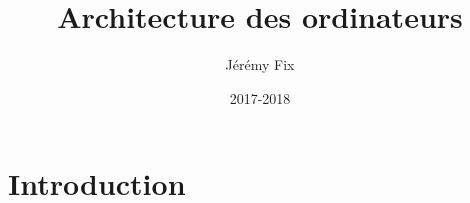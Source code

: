 \documentclass{beamer}
\title[Architecture]{Architecture des ordinateurs} %
\author{Jérémy Fix} %
\institute[CS] %
{
CentraleSupélec \\ %
\medskip
\textit{jeremy.fix@centralesupelec.fr} %
}
\date{2017-2018} %
\begin{document}
\begin{frame}
\titlepage %
\end{frame}



\section{Introduction} %
\end{document}
